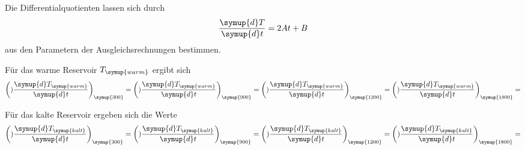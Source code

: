 Die Differentialquotienten lassen sich durch
\begin{equation}
  \frac{\symup{d}T}{\symup{d}t}=2At+B
\end{equation}
aus den Parametern der Ausgleichsrechnungen bestimmen.

Für das warme Reservoir $T_{\symup{warm}}$ ergibt sich
\begin{align*}
  \biggl()\frac{\symup{d}T_{\symup{warm}}}{\symup{d}t}\biggr)_{\symup{300}} =
  \biggl()\frac{\symup{d}T_{\symup{warm}}}{\symup{d}t}\biggr)_{\symup{900}} =
  \biggl()\frac{\symup{d}T_{\symup{warm}}}{\symup{d}t}\biggr)_{\symup{1200}} =
  \biggl()\frac{\symup{d}T_{\symup{warm}}}{\symup{d}t}\biggr)_{\symup{1800}} =
\end{align*}


Für das kalte Reservoir ergeben sich die Werte
\begin{align*}
  \biggl()\frac{\symup{d}T_{\symup{kalt}}}{\symup{d}t}\biggr)_{\symup{300}} =
  \biggl()\frac{\symup{d}T_{\symup{kalt}}}{\symup{d}t}\biggr)_{\symup{900}} =
  \biggl()\frac{\symup{d}T_{\symup{kalt}}}{\symup{d}t}\biggr)_{\symup{1200}} =
  \biggl()\frac{\symup{d}T_{\symup{kalt}}}{\symup{d}t}\biggr)_{\symup{1800}} =
\end{align*}

